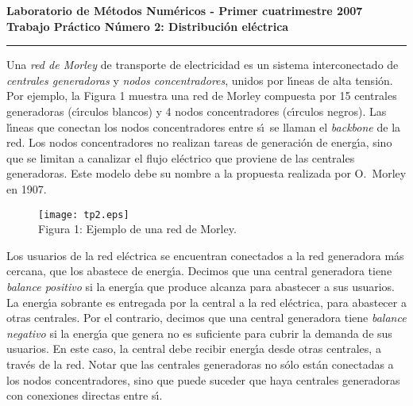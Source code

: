 \begin{centering}
\bf Laboratorio de M\'etodos Num\'ericos - Primer cuatrimestre 2007 \\
\bf Trabajo Pr\'actico N\'umero 2: Distribuci\'on el\'ectrica \\
\end{centering}

\vskip 25pt
\hrule
\vskip 11pt

Una \emph{red de Morley} de transporte de electricidad es un sistema
interconectado de \emph{centrales generadoras} y \emph{nodos concentradores},
unidos por l\'\i neas de alta tensi\'on. Por ejemplo, la Figura 1
muestra una red de Morley compuesta por 15 centrales generadoras
(c\'\i rculos blancos) y 4 nodos concentradores (c\'\i rculos negros). Las
l\'\i neas que conectan los nodos concentradores entre s\'\i\ se llaman
el \emph{backbone} de la red. Los nodos concentradores no realizan tareas
de generaci\'on de energ\'\i a, sino que se limitan a canalizar el flujo
el\'ectrico que proviene de las centrales generadoras. Este modelo debe
su nombre a la propuesta realizada por O.~Morley en 1907.

\begin{figure}[h]
\centering
\texttt{[image: tp2.eps]} \\
Figura 1: Ejemplo de una red de Morley.
\end{figure}

Los usuarios de la red el\'ectrica se encuentran conectados a la red
generadora m\'as cercana, que los abastece de energ\'\i a. Decimos que una
central generadora tiene \emph{balance positivo} si la energ\'\i a que
produce alcanza para abastecer a sus usuarios. La energ\'\i a sobrante es
entregada por la central a la red el\'ectrica, para abastecer a otras
centrales. Por el contrario, decimos que una central generadora tiene
\emph{balance negativo} si la energ\'\i a que genera no es suficiente para
cubrir la demanda de sus usuarios. En este caso, la central debe recibir
energ\'\i a desde otras centrales, a trav\'es de la red. Notar que las
centrales generadoras no s\'olo est\'an conectadas a los nodos
concentradores, sino que puede suceder que haya centrales generadoras
con conexiones directas entre s\'\i.

